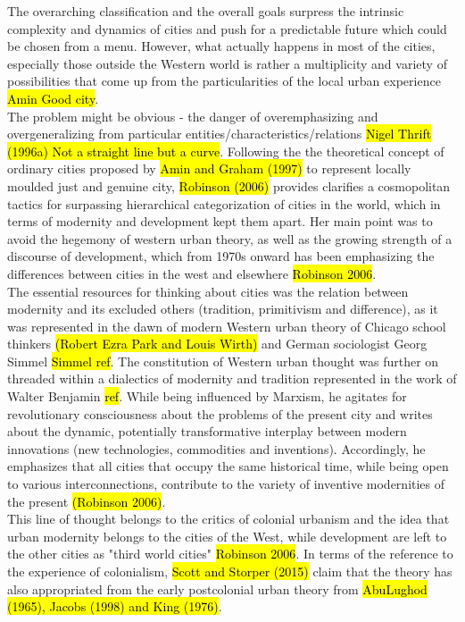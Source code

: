 \documentclass[11pt]{report}
\begin{document}
The overarching classification and the overall goals surpress the intrinsic complexity and dynamics of cities and push for a predictable future which could be chosen  from a menu. However, what actually happens in most of the cities, especially those outside the Western world is rather a multiplicity and variety of possibilities that come up from the particularities of the local urban experience \hl{Amin Good city}.
\\
The problem might be obvious - the danger of overemphasizing and overgeneralizing from particular entities/characteristics/relations \hl{Nigel Thrift (1996a) Not a straight line but a curve}. Following the the theoretical concept of ordinary cities proposed by 
\hl{Amin and Graham (1997)} to represent locally moulded just and genuine city, \hl{Robinson (2006)} provides clarifies a cosmopolitan  tactics  for  surpassing  hierarchical categorization of cities in the world, which in terms of modernity and development kept them apart. Her main point was to avoid the hegemony of western urban theory, as  well as the growing  strength of a discourse of development, which from 1970s onward has been emphasizing the differences between cities in the west and elsewhere \hl{Robinson 2006}. 
\\
The essential  resources  for  thinking  about  cities  was  the relation  between  modernity  and its  excluded  others  (tradition,  primitivism  and  difference),  as  it  was represented  in  the  dawn  of modern Western  urban  theory  of  Chicago  school  thinkers  \hl{(Robert  Ezra Park and Louis Wirth)} and German sociologist Georg Simmel \hl{Simmel ref}. 
The constitution of Western urban thought was further on threaded within a dialectics of modernity and 
tradition represented in the work of Walter Benjamin \hl{ref}. While being influenced by Marxism, he agitates 
for revolutionary consciousness about the problems of the present city and writes about the dynamic, 
potentially transformative interplay between modern innovations (new technologies, commodities and 
inventions). Accordingly, he emphasizes that all cities that occupy the same historical time, while being 
open  to  various  interconnections,  contribute  to  the  variety  of  inventive  modernities  of  the  present 
\hl{(Robinson 2006)}. 
\\
This line of thought belongs to the critics of colonial urbanism and the idea that  urban  modernity belongs to the cities of the West, while development are left to the other cities as "third world cities" \hl{Robinson 2006}.
In terms of the reference to the experience of colonialism, \hl{Scott and Storper (2015)} claim that the theory has also appropriated from the early postcolonial urban theory from \hl{Abu­Lughod (1965), Jacobs (1998) and King (1976)}.
\end{document}
